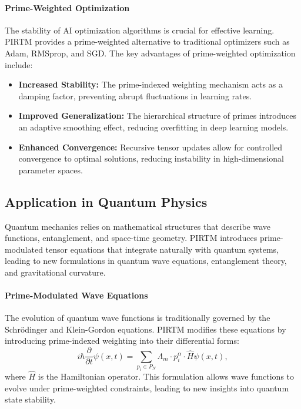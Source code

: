 \documentclass{article}
\theoremstyle{plain}
\begin{document}
\paragraph{Prime-Weighted Optimization}
The stability of AI optimization algorithms is crucial for effective learning. PIRTM provides a prime-weighted alternative to traditional optimizers such as Adam, RMSprop, and SGD. The key advantages of prime-weighted optimization include:
\begin{itemize}
    \item \textbf{Increased Stability:} The prime-indexed weighting mechanism acts as a damping factor, preventing abrupt fluctuations in learning rates.
    \item \textbf{Improved Generalization:} The hierarchical structure of primes introduces an adaptive smoothing effect, reducing overfitting in deep learning models.
    \item \textbf{Enhanced Convergence:} Recursive tensor updates allow for controlled convergence to optimal solutions, reducing instability in high-dimensional parameter spaces.
\end{itemize}

\subsection{Application in Quantum Physics}

Quantum mechanics relies on mathematical structures that describe wave functions, entanglement, and space-time geometry. PIRTM introduces prime-modulated tensor equations that integrate naturally with quantum systems, leading to new formulations in quantum wave equations, entanglement theory, and gravitational curvature.

\paragraph{Prime-Modulated Wave Equations}
The evolution of quantum wave functions is traditionally governed by the Schrödinger and Klein-Gordon equations. PIRTM modifies these equations by introducing prime-indexed weighting into their differential forms:
\begin{equation}
    i \hbar \frac{\partial}{\partial t} \psi(x,t) = \sum_{p_i \in P_N} \Lambda_m \cdot p_i^\alpha \cdot \hat{H} \psi(x,t),
\end{equation}
where \( \hat{H} \) is the Hamiltonian operator. This formulation allows wave functions to evolve under prime-weighted constraints, leading to new insights into quantum state stability.
\end{document}
